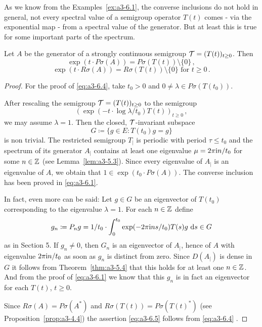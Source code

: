 As we know from the Examples~\ref{ex:a3-6.1}, the converse inclusions do not hold in general, \ie not every spectral value of a semigroup operator $T(t)$ comes - via the exponential map - from a spectral value of the generator.
But at least this is true for some important parts of the spectrum.
\begin{theorem}\label{thm:a3-6.3}
	
Let $A$ be the generator of a strongly continuous semigroup $\mathcal{T} = (T(t))_{t \geq 0}$.
Then
\begin{equation}\label{eq:a3-6.4}
\exp(t \cdot P\sigma(A)) = P\sigma(T(t)) \setminus \{0\}\,,
\end{equation}
\begin{equation}\label{eq:a3-6.5}
\exp(t \cdot R\sigma(A)) = R\sigma(T(t)) \setminus \{0\} \text{ for } t \geq 0\,.
\end{equation}
\end{theorem}
\begin{proof}
For the proof of \eqref{eq:a3-6.4},  take $t_{0} > 0$ and $0 \neq \lambda \in P\sigma(T(t_{0}))$.

After rescaling the semigroup $\mathcal{T} = (T(t))_{t \geq 0}$ to the semigroup
\[
(\exp(-t \cdot \log\lambda/t_{0})T(t))_{t \geq 0}\,,
\]
we may assume $\lambda = 1$. 
Then the closed, $\mathcal{T}$-invariant subspace
\[
G \coloneqq \{g \in E \colon T(t_{0})g = g\}
\]
is non trivial.
The restricted semigroup $T_{|}$ is periodic with period $\tau \leq t_{0}$ and the spectrum of its generator $A_{|}$ contains at least one eigenvalue $\mu = 2\pi\mathrm{i} n/t_{0}$ for some $n \in \mathbb{Z}$ (see Lemma~\ref{lem:a3-5.3}).
Since every eigenvalue of $A_{|}$ is an eigenvalue of $A$, we obtain that $1 \in \exp(t_{0} \cdot P\sigma(A))$.
The converse inclusion has been proved in \eqref{eq:a3-6.1}.

In fact, even more can be said: Let $g \in G$ be an eigenvector of $T(t_{0})$ corresponding to the eigenvalue $\lambda = 1$.
For each $n \in \mathbb{Z}$ define
\[
g_{n} \coloneqq P_{n}g = 1/t_{0} \cdot \int_{0}^{t_{0}} \exp(-2\pi\mathrm{i} ns/t_{0})T(s)g \, \mathop{}\!\mathrm{d}{s} \in G
\]
as in Section 5.
If $g_{n} \ne 0$, then $G_n$ is an eigenvector of $A_{|}$, hence of $A$ with eigenvalue $2\pi\mathrm{i} n/t_{0}$ as soon as $g_{n}$ is distinct from zero.
Since $D(A_{|})$ is dense in $G$ it follows from Theorem~\ref{thm:a3-5.4} that this holds for at least one $n \in \mathbb{Z}$.
And from the proof of \eqref{eq:a3-6.1} we know that this $g_{n}$ is in fact an eigenvector for each $T(t)$, $t \geq 0$.

Since $R\sigma(A) = P\sigma(A^*)$ and $R\sigma(T(t)) = P\sigma(T(t)^*)$ (see Proposition~\ref{prop:a3-4.4}) the assertion \eqref{eq:a3-6.5}  follows from \eqref{eq:a3-6.4} .
\end{proof}
